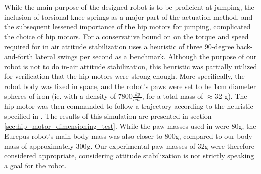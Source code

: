 While the main purpose of the designed robot is to be proficient at jumping, the inclusion of torsional knee springs as a major part of the actuation method, and the subsequent lessened importance of the hip motors for jumping, complicated the choice of hip motors. For a conservative bound on on the torque and speed required for in air attitude stabilization
 \cite{finn_tarek_master} uses a heuristic of three 90-degree back-and-forth lateral swings per second as a benchmark. Although the purpose of our robot is not to do in-air attitude stabilization, this heuristic was partially utilized for verification that the hip motors were strong enough. More specifically, the robot body was fixed in space, and the robot's paws were set to be 1cm diameter spheres of iron (ie. with a density of 7800$\frac{kg}{cm^3}$, for a total mass of $\approx$32 g). The hip motor was then commanded to follow a trajectory according to the heuristic specified in \cite{finn_tarek_master}. The results of this simulation are presented in section \ref{sec:hip_motor_dimensioning_test}. While the paw masses used in \cite{finn_tarek_master} were 80g, the Eurepus robot's main body mass was also closer to 800g, compared to our body mass of approximately 300g. Our experimental paw masses of 32g were therefore considered appropriate, considering attitude stabilization is not strictly speaking a goal for the robot. 
